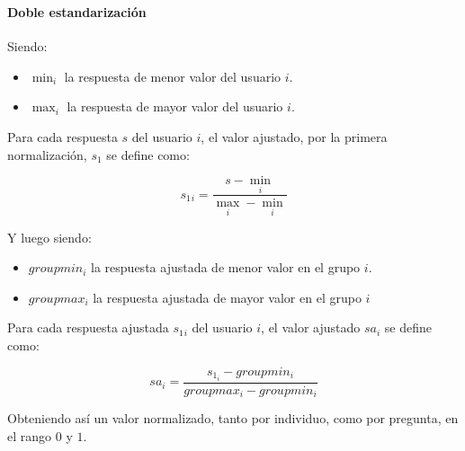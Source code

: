 \begin{frame}[noframenumbering]
\frametitle{\apendixframetitle}
\framesubtitle{Doble estandarización}

\scriptsize
Siendo:
\begin{itemize}
	\item $\min_i$ la respuesta de menor valor del usuario $i$.
	\item $\max_i$ la respuesta de mayor valor del usuario $i$.
\end{itemize}

Para cada respuesta $s$ del usuario $i$, el valor ajustado, por la primera
normalización, $s_1$ se define como:

\begin{equation}
s_1{_i}=\frac{s-\min_i}{\max_i-\min_i}
\end{equation}

Y luego siendo:
\begin{itemize}
	\item $groupmin_i$ la respuesta ajustada de menor valor en el grupo $i$.
	\item $groupmax_i$ la respuesta ajustada de mayor valor en el grupo $i$
\end{itemize}

Para cada respuesta ajustada $s_1{_i}$ del usuario $i$, el valor ajustado $sa_i$ se
define como:	

\begin{equation}
sa_i=\frac{s_{1_i}-groupmin_i}{groupmax_i-groupmin_i}
\end{equation}

Obteniendo así un valor normalizado, tanto por individuo, como por pregunta, en
el rango $0$ y $1$.

\end{frame}